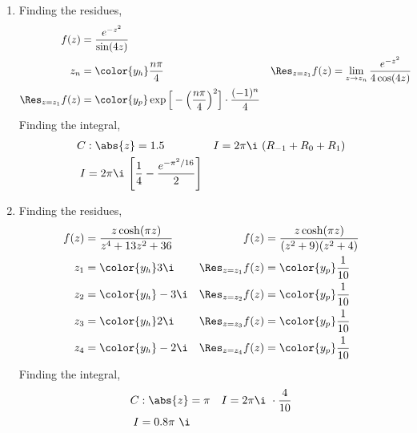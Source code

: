 \begin{enumerate}
    \item Finding the residues,
          \begin{align}
              f(z)                & = \frac{e^{-z^2}}{\sin(4z)}                     \\
              z_n                 & = \color{y_h} \frac{n\pi}{4}                  &
              \Res_{z = z_1} f(z) & = \lim_{z \to z_n} \frac{e^{-z^2}}{4\cos(4z)}   \\
              \Res_{z = z_1} f(z) & = \color{y_p} \exp\Big[- \Big( \frac{n\pi}{4}
                  \Big)^2 \Big] \cdot \frac{(-1)^n}{4}
          \end{align}
          Finding the integral,
          \begin{align}
              C & : \abs{z} = 1.5                                              &
              I & = 2\pi\i\ (R_{-1} + R_0 + R_1)                                 \\
              I & = 2\pi\i\ \Bigg[ \frac{1}{4} - \frac{e^{-\pi^2/16}}{2}\Bigg]
          \end{align}

    \item Finding the residues,
          \begin{align}
              f(z)                & = \frac{z \cosh(\pi z)}{z^4 + 13z^2 + 36}   &
              f(z)                & = \frac{z \cosh(\pi z)}{(z^2 + 9)(z^2 + 4)}   \\
              z_1                 & = \color{y_h} 3\i                           &
              \Res_{z = z_1} f(z) & = \color{y_p} \frac{1}{10}                    \\
              z_2                 & = \color{y_h} -3\i                          &
              \Res_{z = z_2} f(z) & = \color{y_p} \frac{1}{10}                    \\
              z_3                 & = \color{y_h} 2\i                           &
              \Res_{z = z_3} f(z) & = \color{y_p} \frac{1}{10}                    \\
              z_4                 & = \color{y_h} -2\i                          &
              \Res_{z = z_4} f(z) & = \color{y_p} \frac{1}{10}
          \end{align}
          Finding the integral,
          \begin{align}
              C & : \abs{z} =  \pi             &
              I & = 2\pi\i\ \cdot \frac{4}{10}   \\
              I & = 0.8\pi\ \i
          \end{align}


\end{enumerate}
